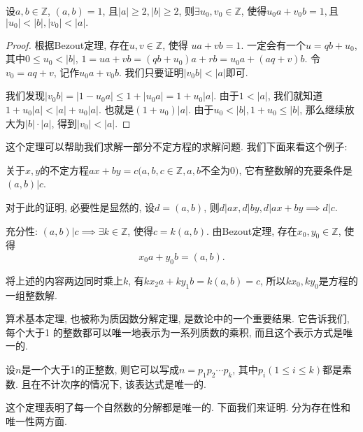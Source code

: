 \begin{theorem}
    设$a,b\in \mathbb Z$, $(a, b)=1$, 且$|a|\geq 2, |b|\geq 2$, 则$\exists u_0,v_0\in \mathbb Z$,
    使得$u_0a+v_0b=1,$且$|u_0|<|b|, |v_0|<|a|.$ 
\end{theorem}

\begin{proof}
    根据Bezout定理, 存在$u,v\in \mathbb Z$, 使得 $ua+vb=1$. 一定会有一个$u=qb+u_0$, 其中$0\leq u_0<|b|$,
    $1=ua+vb=(qb+u_0)a+rb=u_0a+(aq+v)b$. 令$v_0=aq+v$, 记作$u_0a+v_0b$. 我们只要证明$|v_0b|<|a|$即可. 

    我们发现$|v_0b|=|1-u_0a|\leq 1+|u_0a|=1+u_0|a|$. 由于$1<|a|$, 我们就知道$1+u_0|a|<|a|+u_0|a|$. 
    也就是$(1+u_0)|a|$. 由于$u_0<|b|, 1+u_0\leq |b|$, 那么继续放大为$|b|\cdot|a|$, 得到$|v_0|<|a|.$
\end{proof}

这个定理可以帮助我们求解一部分不定方程的求解问题. 我们下面来看这个例子: 

\begin{example}
    关于$x,y$的不定方程$ax+by=c(a,b,c\in \mathbb Z, a,b$不全为$0)$, 它有整数解的充要条件是
    $(a,b)|c$. 
    
    对于此的证明, 必要性是显然的, 设$d=(a,b)$, 则$d|ax, d|by, d|ax+by \implies d|c$.

    充分性: $(a,b)|c\implies \exists k\in \mathbb Z$, 使得$c=k(a,b)$. 由Bezout定理, 
    存在$x_0, y_0\in \mathbb Z$, 使得$$x_0a+y_0b=(a,b). $$
    
    将上述的内容两边同时乘上$k$, 有$kx_2a+ky_1b=k(a,b)=c$, 所以$kx_0, ky_0$是方程的一组整数解. 
\end{example}

 算术基本定理, 也被称为质因数分解定理, 是数论中的一个重要结果. 它告诉我们, 每个大于1
的整数都可以唯一地表示为一系列质数的乘积, 而且这个表示方式是唯一的. 


\begin{theorem}[算术基本定理]
    设$n$是一个大于1的正整数, 则它可以写成$n=p_1p_2\cdots p_k$, 其中$p_i
    (1\leq i\leq k)$都是素数. 且在不计次序的情况下, 该表达式是唯一的. 
\end{theorem}

这个定理表明了每一个自然数的分解都是唯一的. 下面我们来证明. 分为存在性和唯一性两方面.


